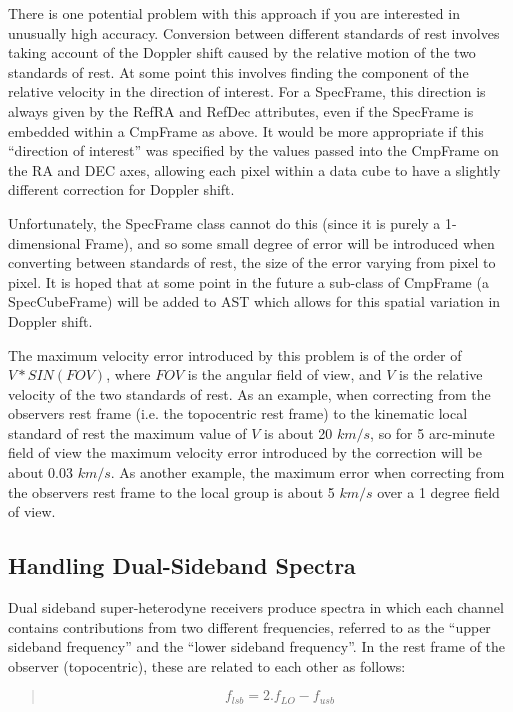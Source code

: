 \documentclass[twoside,11pt]{article}
\begin{document}
There is one potential problem with this approach if you are interested in
unusually high accuracy. Conversion between different standards of rest
involves taking account of the Doppler shift caused by the relative
motion of the two standards of rest. At some point this involves finding
the component of  the relative velocity in the direction of interest.
For a SpecFrame, this direction is always given by the RefRA and RefDec
attributes, even if the SpecFrame is embedded within a CmpFrame as above.
It would be more appropriate if this ``direction of interest'' was
specified by the values passed into the CmpFrame on the RA and DEC axes,
allowing each pixel within a data cube to have a slightly different
correction for Doppler shift.

Unfortunately, the SpecFrame class cannot do this (since it is purely a
1-dimensional Frame), and so some small degree of error will be
introduced when converting between standards of rest, the size of the
error varying from pixel to pixel. It is hoped that at some point in the
future a sub-class of CmpFrame (a SpecCubeFrame) will be added to AST which
allows for this spatial variation in Doppler shift.

The maximum velocity error introduced by this problem is of the order of
$V*SIN(FOV)$, where $FOV$ is the angular field of view, and $V$ is the
relative velocity of the two standards of rest. As an example, when
correcting from the observers rest frame (i.e. the topocentric rest
frame) to the kinematic local standard of rest the maximum value of $V$
is about 20 $km/s$, so for 5 arc-minute field of view the maximum
velocity error introduced by the correction will be about 0.03 $km/s$. As
another example, the maximum error when correcting from the observers
rest frame to the local group is about 5 $km/s$ over a 1 degree field of
view.

\subsection{\label{ss:handlingdualsidebandspectra}Handling Dual-Sideband Spectra}
Dual sideband super-heterodyne receivers produce spectra in which each channel
contains contributions from two different frequencies, referred to as the
``upper sideband frequency'' and the ``lower sideband frequency''. In the
rest frame of the observer (topocentric), these are related to each other as
follows:

\begin{quote}
\begin{small}
\begin{equation}
\label{eqn:dsb}
   f_{lsb} = 2.f_{LO} - f_{usb}
\end{equation}
\end{small}
\end{quote}
\end{document}
